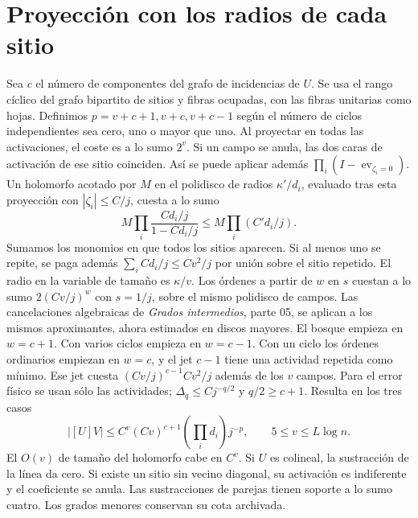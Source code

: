 \section{Proyección con los radios de cada sitio}
Sea $c$ el número de componentes del grafo de incidencias de $U$.
Se usa el rango cíclico del grafo bipartito de sitios y fibras ocupadas, con las
fibras unitarias como hojas. Definimos $p=v+c+1,v+c,v+c-1$ según el número de
ciclos independientes sea cero, uno o mayor que uno.
Al proyectar en todas las activaciones, el coste es a lo sumo $2^v$.
Si un campo se anula, las dos caras de activación de ese sitio coinciden.
Así se puede aplicar además $\prod_i(I-\operatorname{ev}_{\zeta_i=0})$.
Un holomorfo acotado por $M$ en el polidisco de radios $\kappa'/d_i$,
evaluado tras esta proyección con $|\zeta_i|\le C/j$, cuesta a lo sumo
\[
 M\prod_i\frac{Cd_i/j}{1-Cd_i/j}\le M\prod_i(C' d_i/j).
\]
Sumamos los monomios en que todos los sitios aparecen. Si al menos uno se repite,
se paga además $\sum_i C d_i/j\le Cv^2/j$ por unión sobre el sitio repetido.
El radio en la variable de tamaño es $\kappa/v$. Los órdenes a partir de $w$ en $s$
cuestan a lo sumo $2(Cv/j)^w$ con $s=1/j$, sobre el mismo polidisco de campos.
Las cancelaciones algebraicas de \emph{Grados intermedios}, parte 05, se aplican
a los mismos aproximantes, ahora estimados en discos mayores. El bosque empieza en
$w=c+1$. Con varios ciclos empieza en $w=c-1$. Con un ciclo los órdenes ordinarios
empiezan en $w=c$, y el jet $c-1$ tiene una actividad repetida como mínimo.
Ese jet cuesta $(Cv/j)^{c-1}Cv^2/j$ además de los $v$ campos. Para el error
físico se usan sólo las actividades; $\Delta_q\le C j^{-q/2}$ y $q/2\ge c+1$.
Resulta en los tres casos
\[
       |[U]V|\le C^v (Cv)^{c+1}\left(\prod_i d_i\right) j^{-p},
        \qquad 5\le v\le L\log n .
\]
El $O(v)$ de tamaño del holomorfo cabe en $C^v$. Si $U$ es colineal, la
sustracción de la línea da cero. Si existe un sitio sin vecino diagonal, su
activación es indiferente y el coeficiente se anula. Las sustracciones de parejas
tienen soporte a lo sumo cuatro. Los grados menores conservan su cota archivada.
